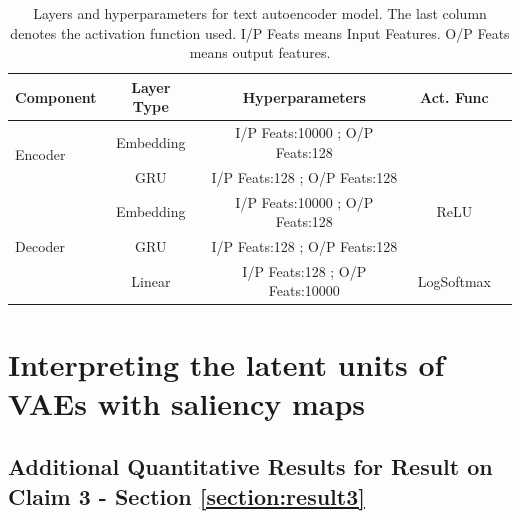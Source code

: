 \begin{table}[h]
    \small
    \centering
    \begin{tabular}{l|cccc}
    \toprule
    \textbf{Component} & \textbf{Layer Type} & \textbf{Hyperparameters} & \textbf{Act. Func} \\
    \midrule 
    \multirow{2}{*}{Encoder} & Embedding & I/P Feats:10000 ; O/P Feats:128 &  \\
    & GRU &I/P Feats:128 ; O/P Feats:128 &  \\
    \midrule
    \multirow{3}{*}{Decoder}& Embedding & I/P Feats:10000 ; O/P Feats:128 & ReLU \\
    & GRU & I/P Feats:128 ; O/P Feats:128 &  \\
    & Linear & I/P Feats:128 ; O/P Feats:10000 & LogSoftmax \\
    \bottomrule
    \end{tabular}
    \caption{Layers and hyperparameters for text autoencoder model. The last column denotes the activation function used. I/P Feats means Input Features. O/P Feats means output features.}
    \label{tab:text_ae_table}
\end{table}

\newpage
\section{Interpreting the latent units of VAEs with saliency maps}
\subsection{Additional Quantitative Results for Result on Claim 3 - Section \ref{section:result3}}

